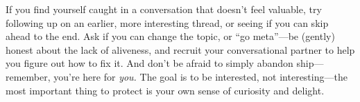 If you find yourself caught in a conversation that doesn't feel valuable, try following up on an earlier, more interesting thread, or seeing if you can skip ahead to the end.  Ask if you can change the topic, or ``go meta''---be (gently) honest about the lack of aliveness, and recruit your conversational partner to help you figure out how to fix it.  And don't be afraid to simply abandon ship---remember, you're here for \emph{you.}  The goal is to be interested, not interesting---the most important thing to protect is your own sense of curiosity and delight.